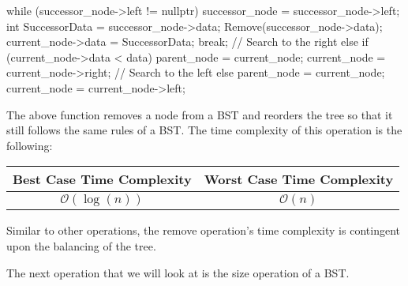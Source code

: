 \begin{highlight}
\begin{code}
{{{{            while (successor_node->left != nullptr) {
                successor_node = successor_node->left;
            }
            int SuccessorData = successor_node->data;
            Remove(successor_node->data);
            current_node->data = SuccessorData;
        }
        break;
    }
        // Search to the right
        else if (current_node->data < data) {
            parent_node = current_node;
            current_node = current_node->right;
        }
        // Search to the left
        else {
            parent_node = current_node;
            current_node = current_node->left;
        }
    }
}
\end{code}

The above function removes a node from a BST and reorders the tree so that it still follows the same rules of a BST. The time complexity of this operation is the following: \newline

\begin{center}
    \begin{tabular}[ht]{|c|c|}
        \hline \textbf{Best Case Time Complexity} & \textbf{Worst Case Time Complexity} \\ \hline
        $\mathcal{O}(\log{(n)})$ & $\mathcal{O}(n)$ \\ \hline
    \end{tabular}
\end{center}

\noindent Similar to other operations, the remove operation's time complexity is contingent upon the balancing of the tree.

\end{highlight}

The next operation that we will look at is the size operation of a BST.

